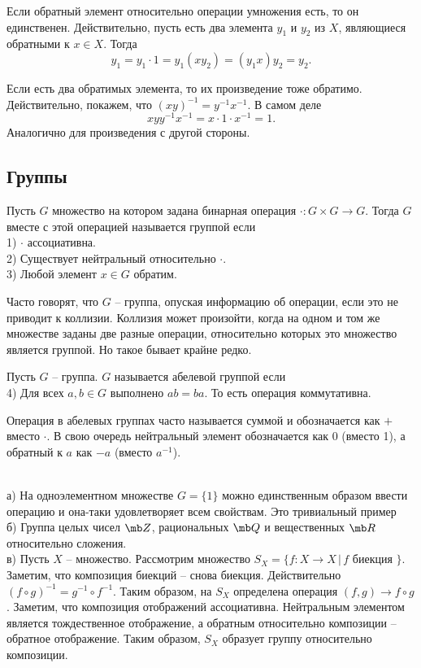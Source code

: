\rm Если обратный элемент относительно операции умножения есть, то он единственен. Действительно, пусть   есть два элемента $y_1$ и $y_2$ из $X$, являющиеся обратными к $x\in X$. Тогда
$$y_1= y_1\cdot 1=y_1(xy_2)=(y_1x)y_2=y_2.$$
\erm

\rm Если есть два обратимых элемента, то их произведение тоже обратимо. Действительно, покажем, что $(xy)^{-1}= y^{-1}x^{-1}$. 
В самом деле 
$$xyy^{-1}x^{-1}= x\cdot 1\cdot x^{-1}=1.$$
Аналогично для произведения с другой стороны.
\erm

\subsection{Группы}

\dfn[Группа] Пусть $G$ множество на котором задана бинарная операция $\cdot \colon G \times G \to G$. Тогда $G$ вместе с этой операцией называется группой если \\
1) $\cdot$ ассоциативна.\\
2) Существует нейтральный относительно $\cdot$.\\
3) Любой элемент $x\in G$ обратим.
\edfn

Часто говорят, что $G$ -- группа, опуская информацию об операции, если это не приводит к коллизии. Коллизия может произойти, когда на одном и том же множестве заданы две разные операции, относительно которых это множество является группой. Но  такое бывает крайне редко.

 Пусть $G$ -- группа. $G$ называется абелевой группой если \\
4) Для всех $a,b \in G$ выполнено $ab=ba$. То есть операция коммутативна.
\edfn

Операция в абелевых группах часто называется суммой и обозначается как $+$ вместо $\cdot$. В свою очередь нейтральный элемент обозначается как $0$ (вместо 1), а обратный к $a$ как $-a$ (вместо $a^{-1}$).

\exm\\
а) На одноэлементном множестве $G=\{1\}$ можно единственным образом ввести операцию и она-таки удовлетворяет всем свойствам. Это тривиальный пример\\
б) Группа целых чисел $\mb Z$, рациональных $\mb Q$ и вещественных $\mb R$ относительно сложения.\\
в) Пусть $X$ -- множество. Рассмотрим множество $S_X=\{f\colon X\to X\,|\, f \text{ биекция }\}$. Заметим, что композиция биекций -- снова биекция. Действительно $(f\circ g)^{-1}=g^{-1}\circ f^{-1}$. Таким образом, на $S_X$ определена операция $(f,g)\to f \circ g$. Заметим, что  композиция отображений ассоциативна. Нейтральным элементом является тождественное отображение, а обратным относительно композиции -- обратное отображение. Таким образом, $S_X$ образует группу относительно композиции.



